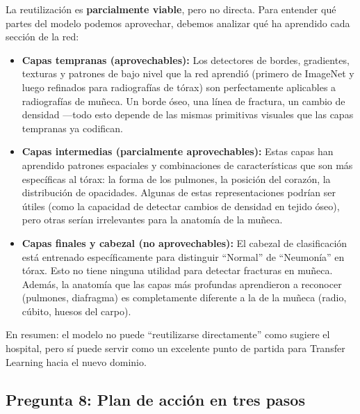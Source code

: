 \documentclass[12pt, letterpaper]{article}
\begin{document}
La reutilización es \textbf{parcialmente viable}, pero no directa. Para entender qué partes
del modelo podemos aprovechar, debemos analizar qué ha aprendido cada sección de la red:

\begin{itemize}[leftmargin=1.5cm]
    \item \textbf{Capas tempranas (aprovechables):} Los detectores de bordes, gradientes,
    texturas y patrones de bajo nivel que la red aprendió (primero de ImageNet y luego
    refinados para radiografías de tórax) son perfectamente aplicables a radiografías de
    muñeca. Un borde óseo, una línea de fractura, un cambio de densidad ---todo esto depende
    de las mismas primitivas visuales que las capas tempranas ya codifican.

    \item \textbf{Capas intermedias (parcialmente aprovechables):} Estas capas han aprendido
    patrones espaciales y combinaciones de características que son más específicas al tórax:
    la forma de los pulmones, la posición del corazón, la distribución de opacidades. Algunas
    de estas representaciones podrían ser útiles (como la capacidad de detectar cambios de
    densidad en tejido óseo), pero otras serían irrelevantes para la anatomía de la muñeca.

    \item \textbf{Capas finales y cabezal (no aprovechables):} El cabezal de clasificación
    está entrenado específicamente para distinguir ``Normal'' de ``Neumonía'' en tórax.
    Esto no tiene ninguna utilidad para detectar fracturas en muñeca. Además, la anatomía
    que las capas más profundas aprendieron a reconocer (pulmones, diafragma) es completamente
    diferente a la de la muñeca (radio, cúbito, huesos del carpo).
\end{itemize}

En resumen: el modelo no puede ``reutilizarse directamente'' como sugiere el hospital, pero sí
puede servir como un excelente punto de partida para Transfer Learning hacia el nuevo dominio.

\subsection{Pregunta 8: Plan de acción en tres pasos}
\end{document}
